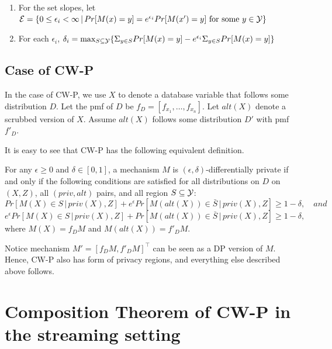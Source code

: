 \documentclass[11pt]{article}
\begin{document}
\begin{enumerate}
\item For the set slopes, let ${\cal E} = \{0 \leq \epsilon_{i} < \infty \,|\, Pr[M(x)=y] = e^{\epsilon_{i}}Pr[M(x')=y] \text{ for some $y \in {\cal Y}$} \}$
\item For each $\epsilon_{i}$,  $\delta_{i} = \max_{S \subseteq {\cal Y}} \{ \Sigma_{y \in S}Pr[M(x)=y] - e^{\epsilon_{i}}\Sigma_{y \in S}Pr[M(x)=y]\}$
\end{enumerate}
\subsection{Case of CW-P}
In the case of CW-P, we use $X$ to denote a database variable that follows some distribution $D$. Let the pmf of $D$ be $f_{D} =[{f_{x_{1}} , \dots, f_{x_{n}}}]$. Let $alt(X)$ denote a scrubbed version of $X$. Assume $alt(X)$ follows some distribution $D'$ with pmf $f'_{D}$.

It is easy to see that CW-P has the following equivalent definition.
\begin{theorem}
For any $\epsilon \geq 0$ and $\delta \in [0, 1]$, a mechanism $M$ is $(\epsilon, \delta)$-differentially private if and only if the following conditions are satisfied for all distributions on $D$ on $(X, Z)$, all $(priv, alt)$ pairs, and all region $S \subseteq {\cal Y}$:
\[
Pr[M(X) \in S \,|\, priv(X), Z]+e^{\epsilon}Pr[M(alt(X)) \in \bar{S}\,|\, priv(X), Z] \geq 1-\delta , \quad and
\]
\[
e^{\epsilon}Pr[M(X) \in S\,|\, priv(X), Z]+Pr[M(alt(X)) \in \bar{S}\,|\, priv(X), Z]  \geq 1-\delta ,
\]
where $M(X) = f_{D}M$ and $M(alt(X))=f'_{D}M$.
\end{theorem}
Notice mechanism $M' = [f_{D}M, f'_{D}M]^{\top}$ can be seen as a DP version of $M$. Hence, CW-P also has form of privacy regions, and everything else described above follows.
\section{Composition Theorem of CW-P in the streaming setting}
\end{document}
